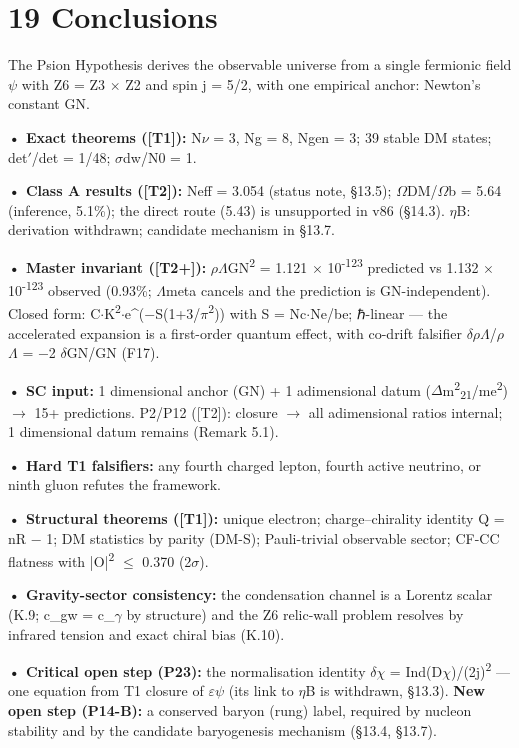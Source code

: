 \documentclass[11pt,letterpaper]{article}
\begin{document}
\section*{19  Conclusions}

\noindent The Psion Hypothesis derives the observable universe from a single fermionic field $\psi$ with Z6 = Z3 $\times$ Z2 and spin j = 5/2, with one empirical anchor: Newton's constant GN.

\noindent \textbf{• Exact theorems ([T1]): }N$\nu$ = 3, Ng = 8, Ngen = 3; 39 stable DM states; det$'$/det = 1/48; $\sigma$dw/N0 = 1.

\noindent \textbf{• Class A results ([T2]): }Neff = 3.054 (status note, §13.5); $\Omega$DM/$\Omega$b = 5.64 (inference, 5.1\%); the direct route (5.43) is unsupported in v86 (§14.3). $\eta$B: derivation withdrawn; candidate mechanism in §13.7.

\noindent \textbf{• Master invariant ([T2+]): }$\rho$$\Lambda$GN\textsuperscript{2} = 1.121 $\times$ 10\textsuperscript{-123} predicted vs 1.132 $\times$ 10\textsuperscript{-123} observed (0.93\%; $\Lambda$meta cancels and the prediction is GN-independent). Closed form: C$\cdot$K\textsuperscript{2}$\cdot$e\textasciicircum{}($-$S(1+3/$\pi$\textsuperscript{2})) with S = Nc$\cdot$Ne/be; ℏ-linear --- the accelerated expansion is a first-order quantum effect, with co-drift falsifier $\delta$$\rho$$\Lambda$/$\rho$$\Lambda$ = $-$2 $\delta$GN/GN (F17).

\noindent \textbf{• SC input: }1 dimensional anchor (GN) + 1 adimensional datum ($\Delta$m\textsuperscript{2}\textsubscript{21}/me\textsuperscript{2}) $\to$ 15+ predictions. P2/P12 ([T2]): closure $\to$ all adimensional ratios internal; 1 dimensional datum remains (Remark 5.1).

\noindent \textbf{• Hard T1 falsifiers: }any fourth charged lepton, fourth active neutrino, or ninth gluon refutes the framework.

\noindent \textbf{• Structural theorems ([T1]): }unique electron; charge--chirality identity Q = nR $-$ 1; DM statistics by parity (DM-S); Pauli-trivial observable sector; CF-CC flatness with |O|\textsuperscript{2} $\le$ 0.370 (2$\sigma$).

\noindent \textbf{• Gravity-sector consistency: }the condensation channel is a Lorentz scalar (K.9; c\_gw = c\_$\gamma$ by structure) and the Z6 relic-wall problem resolves by infrared tension and exact chiral bias (K.10).

\noindent \textbf{• Critical open step (P23): }the normalisation identity $\delta$$\chi$ = Ind(D$\chi$)/(2j)\textsuperscript{2} --- one equation from T1 closure of $\varepsilon$$\psi$ (its link to $\eta$B is withdrawn, §13.3). \textbf{New open step (P14-B): }a conserved baryon (rung) label, required by nucleon stability and by the candidate baryogenesis mechanism (§13.4, §13.7).
\end{document}
